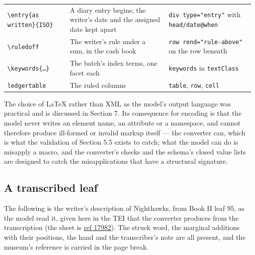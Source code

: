 \documentclass[11pt]{article}
\newcommand{\lf}[3]{\href{https://hopper.commutator.io/#1/\##1/leaf-#2}{#3}}
\begin{document}
\begin{table}[htbp]
\begin{tabular}{lp{6.2cm}l}
\texttt{\textbackslash entry\{as written\}\{ISO\}} & A diary entry begins; the writer's date and the assigned date kept apart & \texttt{div type="entry"} with \texttt{head/date@when}\\
\texttt{\textbackslash ruledoff} & The writer's rule under a sum, in the cash book & \texttt{row rend="rule-above"} on the row beneath\\
\texttt{\textbackslash keywords\{…\}} & The batch's index terms, one facet each & \texttt{keywords} in \texttt{textClass}\\
\texttt{ledgertable} & The ruled columns & \texttt{table}, \texttt{row}, \texttt{cell}\\\bottomrule
\end{tabular}
\end{table}

The choice of LaTeX rather than XML as the model's output language was practical and is discussed in Section 7. Its consequence for encoding is that the model never writes an element name, an attribute or a namespace, and cannot therefore produce ill-formed or invalid markup itself --- the converter can, which is what the validation of Section 5.5 exists to catch; what the model can do is misapply a macro, and the converter's checks and the schema's closed value lists are designed to catch the misapplications that have a structural signature.

\subsection{A transcribed leaf}

The following is the writer's description of Nighthawks, from Book II leaf 95, as the model read it, given here in the TEI that the converter produces from the transcription (the sheet is \lf{book-ii}{95}{ref 17982}). The struck word, the marginal additions with their positions, the hand and the transcriber's note are all present, and the museum's reference is carried in the page break.
\end{document}
